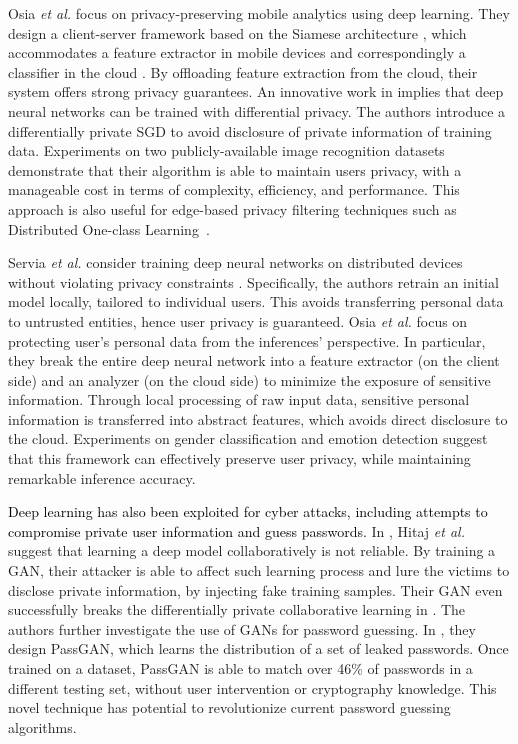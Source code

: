 \documentclass[journal,comsoc,letter]{IEEEtran}
\newcommand{\edit}[1]{\textcolor{black}{#1}}
\begin{document}
Osia \emph{et al.} focus on privacy-preserving mobile analytics using deep learning. They design a client-server framework based on the Siamese architecture \cite{chopra2005learning}, which accommodates a feature extractor in mobile devices and correspondingly a classifier in the cloud \cite{ossia2017hybrid}. By offloading feature extraction from the cloud, their system offers strong privacy guarantees. An innovative work in \cite{abadi2016deep} implies that deep neural networks can be trained with differential privacy. The authors introduce a differentially private SGD to avoid disclosure of private information of training data. Experiments on two publicly-available image recognition datasets demonstrate that their algorithm is able to maintain users privacy, with a manageable cost in terms of complexity, efficiency, and performance. This approach is also useful for edge-based privacy filtering techniques such as Distributed One-class Learning~\cite{shamsabadi2018}. 

Servia \emph{et al.} consider training deep neural networks on distributed devices without violating privacy constraints \cite{servia2017personal}. Specifically, the authors retrain an initial model locally, tailored to individual users. This avoids transferring personal data to untrusted entities, hence user privacy is guaranteed. Osia \emph{et al.} focus on protecting user's personal data from the inferences' perspective. In particular, they break the entire deep neural network into a feature extractor (on the client side) and an analyzer (on the cloud side) to minimize the exposure of sensitive information. Through local processing of raw input data, sensitive personal information is transferred into abstract features, which avoids direct disclosure to the cloud.
Experiments on gender classification and emotion detection suggest that this framework can effectively preserve user privacy, while maintaining remarkable inference accuracy.

\edit{Deep learning has also been exploited for cyber attacks, including attempts to compromise private user information and guess passwords.}
In \cite{hitaj2017deep}, Hitaj \emph{et al.} suggest that learning a deep model collaboratively is not reliable. By training a GAN, their attacker is able to affect such learning process and lure the victims to disclose private information, by injecting fake training samples. Their GAN even successfully breaks the differentially private collaborative learning in \cite{abadi2016deep}. The authors further investigate the use of GANs for password guessing. In \cite{hitaj2017passgan}, they design PassGAN, which learns the distribution of a set of leaked passwords. Once trained on a dataset, PassGAN is able to match over 46\% of passwords in a different testing set, without user intervention or cryptography knowledge. This novel technique has potential to revolutionize current password guessing algorithms. 
\end{document}
